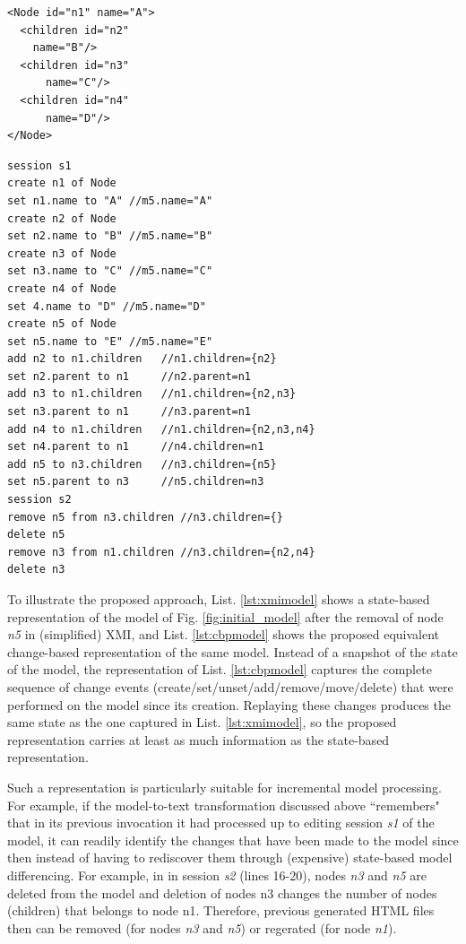 \documentclass{llncs}
\begin{document}
\noindent
\begin{minipage}[t]{0.34\linewidth}
\begin{lstlisting}[style=xmi,caption={State-based representation of the model of Figure \ref{fig:initial_model} after removal of node \emph{n5} in (simplified) XMI.},label=lst:xmimodel]
<Node id="n1" name="A">
  <children id="n2" 
    name="B"/>
  <children id="n3"
      name="C"/>
  <children id="n4"
      name="D"/>
</Node>
\end{lstlisting}
\end{minipage}
\hfill
\begin{minipage}[t]{0.635\linewidth}
\begin{lstlisting}[style=eol,caption={Change-based representation of the model of Figure \ref{fig:initial_model} after removal of node \emph{n5}.},label=lst:cbpmodel]
session s1
create n1 of Node
set n1.name to "A" //m5.name="A"
create n2 of Node
set n2.name to "B" //m5.name="B"
create n3 of Node
set n3.name to "C" //m5.name="C"
create n4 of Node
set 4.name to "D" //m5.name="D"
create n5 of Node
set n5.name to "E" //m5.name="E"
add n2 to n1.children   //n1.children={n2}
set n2.parent to n1     //n2.parent=n1
add n3 to n1.children   //n1.children={n2,n3}
set n3.parent to n1     //n3.parent=n1
add n4 to n1.children   //n1.children={n2,n3,n4}
set n4.parent to n1     //n4.children=n1
add n5 to n3.children   //n3.children={n5}
set n5.parent to n3     //n5.children=n3
session s2
remove n5 from n3.children //n3.children={}
delete n5 
remove n3 from n1.children //n3.children={n2,n4}
delete n3
\end{lstlisting}
\end{minipage}

To illustrate the proposed approach, List. \ref{lst:xmimodel} shows a state-based representation of the model of Fig. \ref{fig:initial_model} after the removal of node \emph{n5} in (simplified) XMI, and List. \ref{lst:cbpmodel} shows the proposed equivalent change-based representation of the same model. Instead of a snapshot of the state of the model, the representation of List. \ref{lst:cbpmodel} captures the complete sequence of change events (create/set/unset/add/remove/move/delete) that were performed on the model since its creation. Replaying these changes produces the same state as the one captured in List. \ref{lst:xmimodel}, so the proposed representation carries at least as much information as the state-based representation.

Such a representation is particularly suitable for incremental model processing. For example, if the model-to-text transformation discussed above ``remembers" that in its previous invocation it had processed up to editing session \emph{s1} of the model, it can readily identify the changes that have been made to the model since then instead of having to rediscover them through (expensive) state-based model differencing. For example, in in session \emph{s2} (lines 16-20), nodes \emph{n3} and \emph{n5} are deleted from the model and deletion of nodes n3 changes the number of nodes (children) that belongs to node {n1}. Therefore, previous generated HTML files then can be removed (for nodes \emph{n3} and \emph{n5}) or regerated (for node \emph{n1}). 
\end{document}
